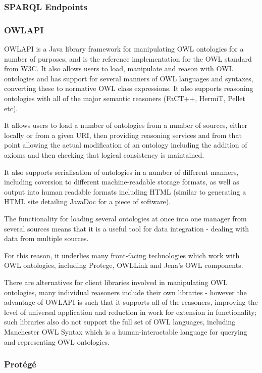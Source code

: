\documentclass{article}
\begin{document}
\subsubsection{SPARQL Endpoints}

\subsubsection{OWLAPI}

OWLAPI is a Java library framework for manipulating OWL ontologies for a number of
purposes, and is the reference implementation for the OWL standard from W3C. 
It also allows users to load, manipulate and reason with OWL ontologies and has 
support for several manners of OWL languages and syntaxes, converting these to 
normative OWL class expressions. It also supports reasoning ontologies with all
of the major semantic reasoners (FaCT++, HermiT, Pellet etc).

It allows users to load a number of ontologies from a number of sources, either
locally or from a given URI, then providing reasoning services and from that
point allowing the actual modification of an ontology including the addition of
axioms and then checking that logical consistency is maintained.

It also supports serialisation of ontologies in a number of different manners,
including coversion to different machine-readable storage formats, as well as
output into human readable formats including HTML (similar to generating a HTML
site detailing JavaDoc for a piece of software).

The functionality for loading several ontologies at once into one manager from
several sources means that it is a useful tool for data integration - dealing
with data from multiple sources.

For this reason, it underlies many front-facing technologies which work with OWL
ontologies, including Protege, OWLLink and Jena's OWL components.

There are alternatives for client libraries involved in manipulating OWL
ontologies, many individual reasoners include their own libraries - however the
advantage of OWLAPI is such that it supports all of the reasoners, improving
the level of universal application and reduction in work for extension in
functionality; such libraries also do not support the full set of OWL languages,
including Manchester OWL Syntax which is a human-interactable language for
querying and representing OWL ontologies.

\subsubsection{Protégé}
\end{document}
